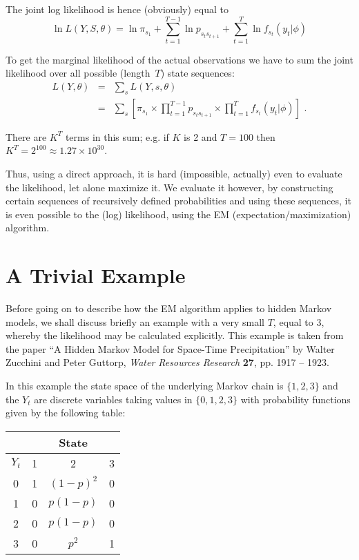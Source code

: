 The joint log likelihood is hence (obviously) equal to
\[
\ln L(Y,S,\theta) = \ln \pi_{s_1} + \sum_{t=1}^{T-1} \ln p_{s_t s_{t+1}}
                  + \sum_{t=1}^T \ln f_{s_t}(y_t|\phi)
\]

To get the marginal likelihood of the actual observations we have to
sum the joint likelihood over all possible (length~$T$) state
sequences:
\begin{eqnarray*}
L(Y,\theta) & = & \sum_s L(Y,s,\theta) \\
            & = & \sum_s \left[ \pi_{s_1} \times
                  \prod_{t=1}^{T-1} p_{s_t s_{t+1}}
                  \times \prod_{t=1}^T f_{s_t}(y_t|\phi) \right] \mbox{ .}
\end{eqnarray*}

There are $K^T$ terms in this sum; e.g. if $K$ is 2 and $T = 100$
then $K^T = 2^{100} \approx 1.27 \times 10^{30}$.

Thus, using a direct approach, it is hard (impossible, actually) even
to evaluate the likelihood, let alone maximize it.  We 
evaluate it however, by constructing certain sequences of recursively
defined probabilities and using these sequences, it is even possible
to  the (log) likelihood, using the EM
(expectation/maximization) algorithm.

\section{A Trivial Example}

\label{sec:triv.ex}
Before going on to describe how the EM algorithm applies to hidden
Markov models, we shall discuss briefly an example with a very
small $T$, equal to 3, whereby the likelihood may be calculated
explicitly.  This example is taken from the paper ``A Hidden Markov
Model for Space-Time Precipitation'' by Walter Zucchini and Peter
Guttorp, {\em Water Resources Research} {\bf 27}, pp. 1917 -- 1923.

In this example the state space of the underlying Markov chain is
$\{1,2,3\}$ and the $Y_t$ are discrete variables taking values in
$\{0,1,2,3\}$ with probability functions given by the following table:

\begin{centre}
\begin{tabular}{c||c|c|c}
 & \multicolumn{3}{|c}{State} \\ \hline
    $Y_t$ & 1 & 2         & 3 \\ \hline \hline
    0 & 1 & $(1-p)^2$ & 0 \\ \hline
    1 & 0 & $p(1-p)$  & 0 \\ \hline
    2 & 0 & $p(1-p)$  & 0 \\ \hline
    3 & 0 & $p^2$     & 1
\end{tabular}
\end{centre}

